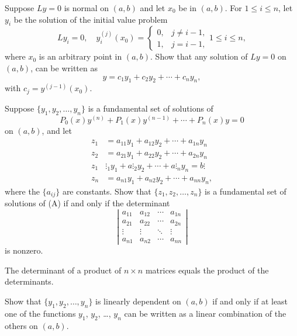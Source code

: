 \documentclass{ximera}
\begin{document}
\begin{problem}\label{exer:9.1.14}
Suppose $Ly=0$ is normal on $(a,b)$ and let $x_0$ be in $(a,b)$.
For $1\le i\le n$, let $y_i$ be the solution of the initial value
problem
$$
Ly_i=0, \quad  y_i^{(j)} (x_0)=
\left\{\begin{array}{cl}
0,& j\ne i-1,\\  
1,&j=i-1,\end{array}\right. 1\le i\le n,
$$
where $x_0$ is an arbitrary point in $(a,b)$.  Show that any solution
of $Ly=0$ on $(a, b)$, can be written as
$$
y=c_1y_1+c_2y_2+\cdots+c_ny_n,
$$
with $c_j=y^{(j-1)}(x_0)$.
\end{problem}

\begin{problem}\label{exer:9.1.15}
Suppose $\{y_1, y_2,\dots, y_n\}$ is a fundamental set of
solutions of
$$
P_0(x)y^{(n)}+P_1(x)y^{(n-1)}+\cdots+P_n(x)y=0
$$
on $(a,b)$, and let
$$
\begin{array}{rl}
z_1&=a_{11}y_1+a_{12}y_2+\cdots+a_{1n}y_n\\
z_2&=a_{21}y_1+a_{22}y_2+\cdots+a_{2n}y_n\\
 z_1&\vdots _1y_1+a\vdots
 _2y_2+\cdots+a\vdots _ny_n  =b\vdots\\
z_n&=a_{n1}y_1+a_{n2}y_2+\cdots+a_{nn}y_n,
\end{array}
$$
where the $\{a_{ij}\}$ are constants. Show that $\{z_1, z_2,\dots,
z_n\}$ is a fundamental set of solutions  of (A) if and only if the
determinant
$$
\left|\begin{array}{cccc}
a_{11}&a_{12}&\cdots&a_{1n}\\
a_{21}&a_{22}&\cdots&a_{2n}\\
\vdots&\vdots&\ddots&\vdots\\
a_{n1}&a_{n2}&\cdots&a_{nn}\end{array}\right|
$$
is nonzero.

\begin{hint}
The determinant of a product of  $n\times
n$ matrices equals the product of the determinants.
\end{hint}
\end{problem}


\begin{problem}\label{exer:9.1.16}
Show that $\{y_1,y_2,\dots,y_n\}$ is linearly dependent on $(a,b)$ if
and only if at least one of the functions $y_1$, $y_2$, \dots, $y_n$ can be
written as a linear combination of the others on $(a,b)$.
\end{problem}
\end{document}
